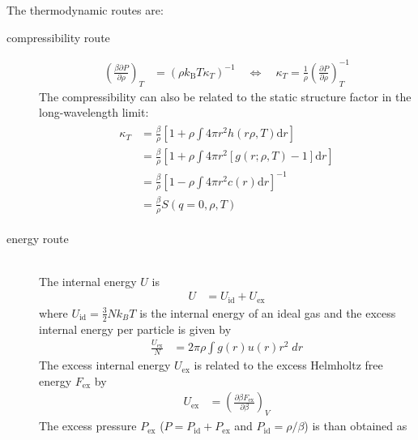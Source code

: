 The thermodynamic routes are:
\begin{description}
\item[compressibility route]
\begin{align} \label{eq:compressibility}
\left(\frac{\beta \partial P}{\partial\rho}\right)_T &= \left(\rho
k_\mathrm{B} T \kappa_T\right)^{-1} \quad \Leftrightarrow \quad
\kappa_T = \frac{1}{\rho} \left(\frac{\partial
P}{\partial\rho}\right)^{-1}_T
\end{align}
The compressibility can also be related to the static structure factor in the long-wavelength limit:
\begin{align} \label{eq:compressibilitySQ}
\begin{split}
\kappa_T &= \frac{\beta}{\rho} \left[1+\rho \displaystyle \int 4\pi r^2 h(r\rho,T) \mathrm{d}r\right] \\
         &= \frac{\beta}{\rho} \left[1+\rho \displaystyle \int 4\pi r^2 \left[g(r;\rho,T)-1\right] \mathrm{d}r\right] \\
         &= \frac{\beta}{\rho} \left[ 1-\rho\int 4\pi r^2 c(r) \mathrm{d}r\right]^{-1} \\
         &= \frac{\beta}{\rho} S(q=0,\rho,T)
\end{split}
\end{align}
\item[energy route] ~\vphantom{.} \\
The internal energy $U$ is
\begin{align}
U &= U_\text{id} + U_\text{ex}
\end{align}
where $U_\text{id}=\frac{3}{2} N k_B T$ is the internal energy of an ideal gas and
the excess internal energy per particle is given by
\begin{align} \label{eq:internal_energy}
\frac{U_\text{ex}}{N} &= 2\pi\rho \int g(r) u(r) r^2 \;dr
\end{align}
The excess internal energy $U_\text{ex}$ is related to the excess Helmholtz free energy
$F_\text{ex}$ by
\begin{align}
U_\text{ex} &= \left(\frac{\partial \beta F_\text{ex}}{\partial \beta}\right)_V
\end{align}
The excess pressure $P_\text{ex}$ ($P=P_\text{id}+P_\text{ex}$ and $P_\text{id}=\rho/\beta$) is than obtained as

\end{description}
